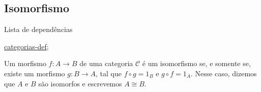 \subsection{Isomorfismo}
\label{isomorfismo-em-categorias-def}
\begin{titlemize}{Lista de dependências}
	\item \hyperref[categorias-def]{categorias-def};\\ %
\end{titlemize}
\begin{defi}[Isomorfismo]
	Um morfismo $f:A \longrightarrow B$ de uma categoria $\mathcal{C}$ é um isomorfismo se, e somente se, existe um morfismo $g:B \longrightarrow A$, tal que $f \circ g = 1_B$ e $g \circ f = 1_A$. Nesse caso, dizemos que $A$ e $B$ são isomorfos e escrevemos $A \cong B$.
\end{defi}


